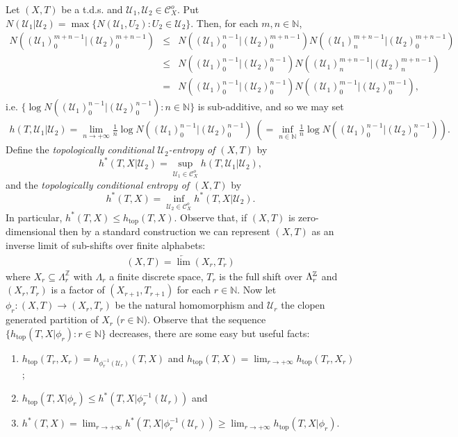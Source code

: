 \documentclass[12pt]{amsart}
\theoremstyle{definition} \theoremstyle{question}
\numberwithin{equation}{section}
\begin{document}
Let $(X, T)$ be a t.d.s. and $\mathcal{U}_1, \mathcal{U}_2\in
\mathcal{C}^o_X$. Put $N (\mathcal{U}_1| \mathcal{U}_2)= \max \{N
(\mathcal{U}_1, U_2): U_2\in \mathcal{U}_2\}$. Then, for each $m,
n\in \mathbb{N}$,
\begin{eqnarray*}
N ((\mathcal{U}_1)_0^{m+ n- 1}| (\mathcal{U}_2)_0^{m+ n- 1})&\le & N
((\mathcal{U}_1)_0^{n- 1}| (\mathcal{U}_2)_0^{m+ n- 1}) N
((\mathcal{U}_1)_n^{m+ n- 1}| (\mathcal{U}_2)_0^{m+ n- 1}) \\
&\le & N ((\mathcal{U}_1)_0^{n- 1}| (\mathcal{U}_2)_0^{n- 1}) N
((\mathcal{U}_1)_n^{m+ n- 1}| (\mathcal{U}_2)_n^{m+ n- 1}) \\
&= & N ((\mathcal{U}_1)_0^{n- 1}| (\mathcal{U}_2)_0^{n- 1}) N
((\mathcal{U}_1)_0^{m- 1}| (\mathcal{U}_2)_0^{m- 1}),
\end{eqnarray*}
i.e. $\{\log N ((\mathcal{U}_1)_0^{n- 1}| (\mathcal{U}_2)_0^{n- 1}):
n\in \mathbb{N}\}$ is sub-additive, and so we may set
\begin{eqnarray*}
h (T, \mathcal{U}_1| \mathcal{U}_2)= \lim_{n\rightarrow +\infty}
\frac{1}{n} \log N ((\mathcal{U}_1)_0^{n- 1}| (\mathcal{U}_2)_0^{n-
1})\ \left(= \inf_{n\in \mathbb{N}} \frac{1}{n} \log N
((\mathcal{U}_1)_0^{n- 1}| (\mathcal{U}_2)_0^{n- 1})\right).
\end{eqnarray*}
Define the {\it topologically conditional $\mathcal{U}_2$-entropy of
$(X, T)$} by $$h^* (T, X| \mathcal{U}_2)= \sup_{\mathcal{U}_1\in
\mathcal{C}_X^o} h (T, \mathcal{U}_1| \mathcal{U}_2),$$ and the {\it
topologically conditional entropy of $(X, T)$} by $$h^* (T, X)=
\inf_{\mathcal{U}_2\in \mathcal{C}_X^o} h^* (T, X| \mathcal{U}_2).$$
In particular, $h^* (T, X)\le h_{\text{top}} (T, X)$. Observe that, if $(X, T)$
is zero-dimensional then by a standard construction we can represent
$(X, T)$ as an inverse limit of sub-shifts over finite alphabets:
\begin{eqnarray*}
(X, T)= \underleftarrow{\lim} (X_r, T_r)
\end{eqnarray*}
where $X_r\subseteq \Lambda_r^\mathbb{Z}$ with $\Lambda_r$ a finite
discrete space, $T_r$ is the full shift over $\Lambda_r^{\Bbb Z}$ and $(X_r,
T_r)$ is a factor of $(X_{r+ 1}, T_{r+ 1})$ for each $r\in
\mathbb{N}$. Now let $\phi_r: (X, T)\rightarrow (X_r, T_r)$ be the
natural homomorphism and $\mathcal{U}_r$ the clopen generated
partition of $X_r$ ($r\in \mathbb{N}$). Observe that the sequence
$\{h_{\text{top}} (T, X| \phi_r): r\in \mathbb{N}\}$ decreases,
there are some easy but useful facts:
\begin{enumerate}

\item $h_{\text{top}} (T_r, X_r)= h_{\phi_r^{- 1} (\mathcal{U}_r)}
(T, X)$ and $h_{\text{top}} (T, X)= \lim_{r\rightarrow +\infty}
h_{\text{top}} (T_r, X_r)$;

\item $h_{\text{top}} (T, X| \phi_r)\le h^* (T, X| \phi_r^{- 1}
(\mathcal{U}_r))$ and

\item $h^* (T, X)= \lim_{r\rightarrow +\infty} h^* (T, X|
\phi_r^{- 1} (\mathcal{U}_r))\ge \lim_{r\rightarrow +\infty}
h_{\text{top}} (T, X| \phi_r)$.
\end{enumerate}
\end{document}
